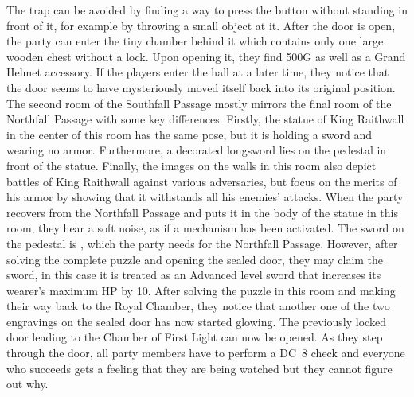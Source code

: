 The trap can be avoided by finding a way to press the button without standing in front of it, for example by throwing a small object at it.
After the door is open, the party can enter the tiny chamber behind it which contains only one large wooden chest without a lock.
Upon opening it, they find 500G as well as a Grand Helmet accessory.
If the players enter the hall at a later time, they notice that the door seems to have mysteriously moved itself back into its original position. 
%
\ofpar
%
The second room of the Southfall Passage mostly mirrors the final room of the Northfall Passage with some key differences.
Firstly, the statue of King Raithwall in the center of this room has the same pose, but it is holding a sword and wearing no armor.
Furthermore, a decorated longsword lies on the pedestal in front of the statue.
Finally, the images on the walls in this room also depict battles of King Raithwall against various adversaries, but focus on the merits of his armor by showing that it withstands all his enemies' attacks.
When the party recovers  from the Northfall Passage and puts it in the body of the statue in this room, they hear a soft noise, as if a mechanism has been activated.
The sword on the pedestal is , which the party needs for the Northfall Passage.
However, after solving the complete puzzle and opening the sealed door, they may claim the sword, in this case it is treated as an Advanced level sword that increases its wearer's maximum HP by 10.
%
\ofpar
%
After solving the puzzle in this room and making their way back to the Royal Chamber, they notice that another one of the two engravings on the sealed door has now started glowing.
The previously locked door leading to the Chamber of First Light can now be opened.
As they step through the door, all party members have to perform a DC~8 check and everyone who succeeds gets a feeling that they are being watched but they cannot figure out why.
%
\vfill
%
